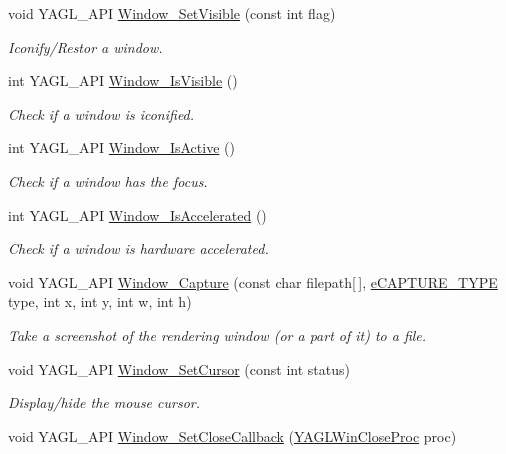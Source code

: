 \begin{DoxyCompactItemize}
void Y\-A\-G\-L\-\_\-\-A\-P\-I \hyperlink{group____window_gaae0db1f486524085101e661ee57f921b}{Window\-\_\-\-Set\-Visible} (const int flag)
\begin{DoxyCompactList}\small\item\em Iconify/\-Restor a window. \end{DoxyCompactList}\item 
int Y\-A\-G\-L\-\_\-\-A\-P\-I \hyperlink{group____window_ga6a604ab9207347c2a0b72490846d361a}{Window\-\_\-\-Is\-Visible} ()
\begin{DoxyCompactList}\small\item\em Check if a window is iconified. \end{DoxyCompactList}\item 
int Y\-A\-G\-L\-\_\-\-A\-P\-I \hyperlink{group____window_gaaa82953eb660afd5c2f33656f68860c6}{Window\-\_\-\-Is\-Active} ()
\begin{DoxyCompactList}\small\item\em Check if a window has the focus. \end{DoxyCompactList}\item 
int Y\-A\-G\-L\-\_\-\-A\-P\-I \hyperlink{group____window_gab2a76593e5240f77193cc0e18f9e829e}{Window\-\_\-\-Is\-Accelerated} ()
\begin{DoxyCompactList}\small\item\em Check if a window is hardware accelerated. \end{DoxyCompactList}\item 
void Y\-A\-G\-L\-\_\-\-A\-P\-I \hyperlink{group____window_ga6f1988a980a344472bcc3a0b3b24ed84}{Window\-\_\-\-Capture} (const char filepath\mbox{[}$\,$\mbox{]}, \hyperlink{group____enums_ga2f60dfad6de37348e99af1c69a907f7d}{e\-C\-A\-P\-T\-U\-R\-E\-\_\-\-T\-Y\-P\-E} type, int x, int y, int w, int h)
\begin{DoxyCompactList}\small\item\em Take a screenshot of the rendering window (or a part of it) to a file. \end{DoxyCompactList}\item 
void Y\-A\-G\-L\-\_\-\-A\-P\-I \hyperlink{group____window_ga97a1238bd052a7482322acfd3e37aab0}{Window\-\_\-\-Set\-Cursor} (const int status)
\begin{DoxyCompactList}\small\item\em Display/hide the mouse cursor. \end{DoxyCompactList}\item 
void Y\-A\-G\-L\-\_\-\-A\-P\-I \hyperlink{group____window_gabe87127a4dd79764ef3308efe50eb6ea}{Window\-\_\-\-Set\-Close\-Callback} (\hyperlink{group____callbacks_ga75b61763676e4aa7c18f0956518bf740}{Y\-A\-G\-L\-Win\-Close\-Proc} proc)

\end{DoxyCompactItemize}

